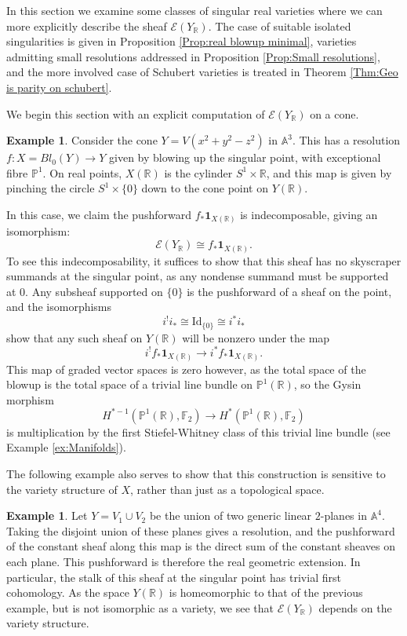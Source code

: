 \documentclass{amsart}
\theoremstyle{definition}
\newtheorem{ex}[thm]{Example}
\theoremstyle{remark}
\begin{document}
In this section we examine some classes of singular real varieties where we can more explicitly describe the sheaf $\mathscr{E}(Y_\mathbb{R})$. The case of suitable isolated singularities is given in Proposition \ref{Prop:real blowup minimal}, varieties admitting small resolutions addressed in Proposition \ref{Prop:Small resolutions}, and the more involved case of Schubert varieties is treated in Theorem \ref{Thm:Geo is parity on schubert}.

We begin this section with an explicit computation of $\mathscr{E}(Y_\mathbb{R})$ on a cone.

\begin{ex}\label{Ex:explicit computation}
Consider the cone $Y=V(x^2+y^2-z^2)$ in $\mathbb{A}^3$. This has a resolution $f:X=Bl_0(Y)\to Y$ given by blowing up the singular point, with exceptional fibre $\mathbb{P}^1$. On real points, $X(\mathbb{R})$ is the cylinder $S^1\times \mathbb{R}$, and this map is given by pinching the circle $S^1\times \{0\}$ down to the cone point on $Y(\mathbb{R})$.

In this case, we claim the pushforward $f_*\mathbf{1}_{X(\mathbb{R})}$ is indecomposable, giving an isomorphism: \[\mathscr{E}(Y_\mathbb{R})\cong f_*\mathbf{1}_{X(\mathbb{R})}.\] 
To see this indecomposability, it suffices to show that this sheaf has no skyscraper summands at the singular point, as any nondense summand must be supported at $0$. Any subsheaf supported on $\{0\}$ is the pushforward of a sheaf on the point, and the isomorphisms \[i^!i_*\cong \text{Id}_{\{0\}}\cong i^*i_*\] show that any such sheaf on $Y(\mathbb{R})$ will be nonzero under the map \[i^!f_*\mathbf{1}_{X(\mathbb{R})}\to i^*f_*\mathbf{1}_{X(\mathbb{R})}.\] This map of graded vector spaces is zero however, as the total space of the blowup is the total space of a trivial line bundle on $\mathbb{P}^1(\mathbb{R})$, so the Gysin morphism
\[H^{*-1}(\mathbb{P}^1(\mathbb{R}),\mathbb{F}_2)\to H^*(\mathbb{P}^1(\mathbb{R}),\mathbb{F}_2)\] is multiplication by the first Stiefel-Whitney class of this trivial line bundle (see Example \ref{ex:Manifolds}).
\end{ex}

The following example also serves to show that this construction is sensitive to the variety structure of $X$, rather than just as a topological space.

\begin{ex}\label{Ex:Two planes}
Let $Y=V_1\cup V_2$ be the union of two generic linear $2$-planes in $\mathbb{A}^4$. Taking the disjoint union of these planes gives a resolution, and the pushforward of the constant sheaf along this map is the direct sum of the constant sheaves on each plane. This pushforward is therefore the real geometric extension. In particular, the stalk of this sheaf at the singular point has trivial first cohomology. As the space $Y(\mathbb{R})$ is homeomorphic to that of the previous example, but is not isomorphic as a variety, we see that $\mathscr{E}(Y_\mathbb{R})$ depends on the variety structure.
\end{ex}
\end{document}
